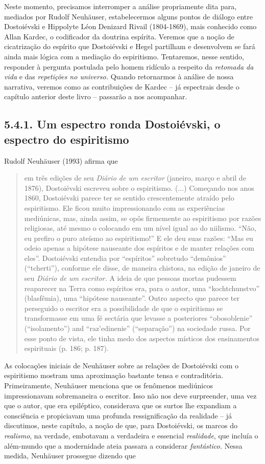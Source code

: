 Neste momento, precisamos interromper a análise propriamente dita para,
mediados por Rudolf Neuhäuser, estabelecermos alguns pontos de diálogo
entre Dostoiévski e Hippolyte Léon Denizard Rivail (1804-1869), mais
conhecido como Allan Kardec, o codificador da doutrina espírita. Veremos
que a noção de cicatrização do espírito que Dostoiévski e Hegel
partilham e desenvolvem se fará ainda mais lógica com a mediação do
espiritismo. Tentaremos, nesse sentido, responder à pergunta postulada
pelo homem ridículo a respeito da \emph{retomada da vida} e das
\emph{repetições no universo.} Quando retornarmos à análise de nossa
narrativa, veremos como as contribuições de Kardec -- já espectrais
desde o capítulo anterior deste livro -- passarão a nos acompanhar.

\subsection{5.4.1. Um espectro ronda Dostoiévski, o espectro do espiritismo}

Rudolf Neuhäuser (1993) afirma que

\begin{quote}
em três edições de seu \emph{Diário de um escritor} (janeiro, março e
abril de 1876), Dostoiévski escreveu sobre o espiritismo. (...)
Começando nos anos 1860, Dostoiévski parece ter se sentido
crescentemente atraído pelo espiritismo. Ele ficou muito impressionando
com as experiências mediúnicas, mas, ainda assim, se opôs firmemente ao
espiritismo por razões religiosas, até mesmo o colocando em um nível
igual ao do niilismo. ``Não, eu prefiro o puro ateísmo ao espiritismo!''
E ele deu suas razões: ``Mas eu odeio apenas a hipótese nauseante dos
espíritos e de manter relações com eles''. Dostoiévski entendia por
``espíritos'' sobretudo ``demônios'' (``tcherti''), conforme ele disse,
de maneira chistosa, na edição de janeiro de seu \emph{Diário de um
escritor.} A ideia de que pessoas mortas pudessem reaparecer na Terra
como espíritos era, para o autor, uma ``kochtchunstvo'' (blasfêmia), uma
``hipótese nauseante''. Outro aspecto que parece ter perseguido o
escritor era a possibilidade de que o espiritismo se transformasse em
uma fé sectária que levasse a posteriores ``obosoblenie''
(``isolamento'') and ``raz'edinenie'' (``separação'') na sociedade
russa. Por esse ponto de vista, ele tinha medo dos aspectos místicos dos
ensinamentos espirituais (p. 186; p. 187).
\end{quote}

As colocações iniciais de Neuhäuser sobre as relações de Dostoiévski com
o espiritismo mostram uma aproximação bastante tensa e contraditória.
Primeiramente, Neuhäuser menciona que os fenômenos mediúnicos
impressionavam sobremaneira o escritor. Isso não nos deve surpreender,
uma vez que o autor, que era epiléptico, considerava que os surtos lhe
expandiam a consciência e propiciavam uma profunda ressignificação da
realidade -- já discutimos, neste capítulo, a noção de que, para
Dostoiévski, os marcos do \emph{realismo}, na verdade, embotavam a
verdadeira e essencial \emph{realidade}, que incluía o além-mundo que a
modernidade ateia passara a considerar \emph{fantástico.} Nessa medida,
Neuhäuser prossegue dizendo que

